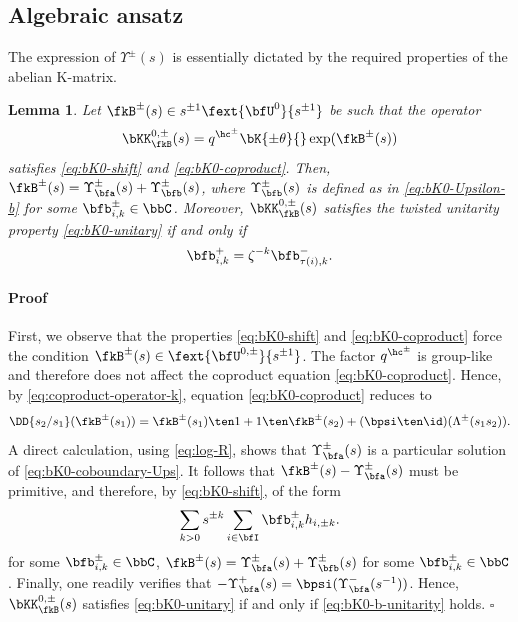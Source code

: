 \documentclass[reqno]{amsart}
\numberwithin{equation}{section}
\newtheorem*{lemma}{Lemma}
\newenvironment{pf}{\medskip\paragraph{{\sc Proof}}}{\hfill$\square$\par\medskip}
\begin{document}
\subsection{Algebraic ansatz}\label{ss:bK0-ansatz}
The expression of $\Upsilon^\pm(s)$ is essentially dictated by the required properties of the abelian K-matrix.

\begin{lemma}\label{lem:bK0-algebraic-ansatz}
Let $\fkB^\pm(s)\in s^{\pm1}\fext{\bfU^{0}}{s^{\pm1}}$ be such that the
operator 
\[\bKK^{0,\pm}_\fkB(s)=q^{\hc^\pm}\bK{\pm\theta}{}\exp(\fkB^\pm(s))\] 
satisfies
\eqref{eq:bK0-shift} and \eqref{eq:bK0-coproduct}. Then, 
$\fkB^\pm(s)=\Upsilon^\pm_\bfa(s)+\Upsilon^\pm_\bfb(s)$, where 
$\Upsilon^\pm_\bfb(s)$ is defined as in \eqref{eq:bK0-Upsilon-b}
for some $\bfb_{i,k}^\pm\in\bbC$. Moreover, $\bKK^{0,\pm}_\fkB(s)$ satisfies the twisted unitarity property \eqref{eq:bK0-unitary} if and only if 
\begin{equation}\label{eq:bK0-b-unitarity}
\bfb_{i,k}^{+}=\zeta^{-k}\bfb_{\tau(i),k}^{-}.
\end{equation}
\end{lemma}

\begin{pf}
First, we observe that the properties \eqref{eq:bK0-shift} and \eqref{eq:bK0-coproduct} force the condition 
$\fkB^\pm(s)\in\fext{\bfU^{0,\pm}}{s^{\pm1}}$.
The factor $q^{\hc^\pm}$ is group-like and therefore does not
affect the coproduct equation \eqref{eq:bK0-coproduct}. Hence, by
\eqref{eq:coproduct-operator-k}, equation \eqref{eq:bK0-coproduct} reduces
to
\begin{equation}\label{eq:bK0-coboundary-Ups}
	\DD{s_2/s_1}(\fkB^{\pm}(s_1))
	=
	\fkB^{\pm}(s_1)\ten 1
	+1\ten\fkB^{\pm}(s_2)
	+(\bpsi\ten\id)(\Lambda^{\pm}(s_1s_2)).
\end{equation}
A direct calculation, using \eqref{eq:log-R}, shows that
$\Upsilon_{\bfa}^{\pm}(s)$ is a particular solution of \eqref{eq:bK0-coboundary-Ups}. 
It follows that $\fkB^\pm(s)-\Upsilon_{\bfa}^\pm(s)$ must be primitive, and therefore, 
by \eqref{eq:bK0-shift}, of the form
\[
\sum_{k>0}s^{\pm k}
\sum_{i\in\bfI}\bfb_{i,k}^{\pm}h_{i,\pm k}.
\]
for some $\bfb_{i,k}^{\pm}\in\bbC$, \ie $\fkB^\pm(s)=\Upsilon_{\bfa}^\pm(s)+\Upsilon_{\bfb}^\pm(s)$ for some $\bfb_{i,k}^{\pm}\in\bbC$.
Finally, one readily verifies that $-\Upsilon_{\bfa}^+(s)=\bpsi(\Upsilon_{\bfa}^-(s^{-1}))$. Hence, $\bKK^{0,\pm}_\fkB(s)$ satisfies \eqref{eq:bK0-unitary} if and only if \eqref{eq:bK0-b-unitarity} holds.
\end{pf}
\end{document}
